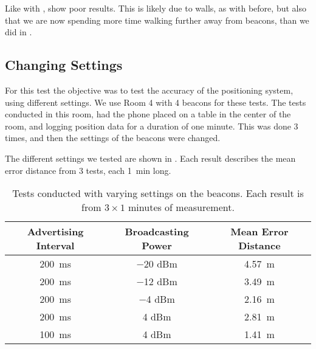 Like with ,  show poor results. 
This is likely due to walls, as with before, 
but also that we are now spending more time walking further away from beacons, 
than we did in .

\subsection{Changing Settings}\label{sec:settings}
For this test the objective was to test the accuracy of the positioning system,
using different settings. 
We use Room 4 with \num{4} beacons for these tests. 
The tests conducted in this room, 
had the phone placed on a table in the center of the room, 
and logging position data for a duration of one minute.
This was done \num{3} times, 
and then the settings of the beacons were changed.

The different settings we tested are shown in .
Each result describes the mean error distance from \num{3} tests, 
each \SI{1}{\minute} long.  

\begin{table}[!htb]
  \centering
  \begin{tabular}{c|c|c}
    Advertising Interval    & Broadcasting Power & Mean Error Distance \\ \hline
    \SI{200}{\milli\second} & \num{-20} dBm      & \SI{4.57}{\meter} \\ 
    \SI{200}{\milli\second} & \num{-12} dBm      & \SI{3.49}{\meter} \\ 
    \SI{200}{\milli\second} & \num{-4} dBm       & \SI{2.16}{\meter} \\ 
    \SI{200}{\milli\second} & \num{4} dBm        & \SI{2.81}{\meter} \\ 
    \SI{100}{\milli\second} & \num{4} dBm        & \SI{1.41}{\meter} \\ 
  \end{tabular}
  \caption{Tests conducted with varying settings on the beacons. Each result is from $3 \times 1$ minutes of measurement.}
  \label{table:precisiontest:settings}
\end{table}

